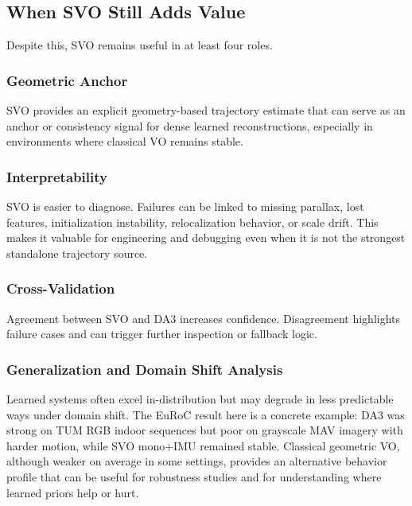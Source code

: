 \documentclass[conference]{IEEEtran}
\begin{document}
\subsection{When SVO Still Adds Value}
Despite this, SVO remains useful in at least four roles.

\subsubsection{Geometric Anchor}
SVO provides an explicit geometry-based trajectory estimate that can serve as an anchor or consistency signal for dense learned reconstructions, especially in environments where classical VO remains stable.

\subsubsection{Interpretability}
SVO is easier to diagnose. Failures can be linked to missing parallax, lost features, initialization instability, relocalization behavior, or scale drift. This makes it valuable for engineering and debugging even when it is not the strongest standalone trajectory source.

\subsubsection{Cross-Validation}
Agreement between SVO and DA3 increases confidence. Disagreement highlights failure cases and can trigger further inspection or fallback logic.

\subsubsection{Generalization and Domain Shift Analysis}
Learned systems often excel in-distribution but may degrade in less predictable ways under domain shift. The EuRoC result here is a concrete example: DA3 was strong on TUM RGB indoor sequences but poor on grayscale MAV imagery with harder motion, while SVO mono+IMU remained stable. Classical geometric VO, although weaker on average in some settings, provides an alternative behavior profile that can be useful for robustness studies and for understanding where learned priors help or hurt.
\end{document}
